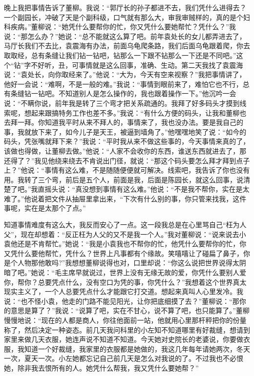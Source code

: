 \documentclass[12pt,oneside]{book}
\begin{document}
晚上我把事情告诉了董柳。我说：``郭厅长的孙子都进不去，我们凭什么进得去？一个副园长，冲破了天是个副科级，口气就有那么大，审我审贼样的，真的是个妇科疾病。''董柳说：``她凭什么要帮你的忙，你又凭什么要她帮忙？凭什么？''我说：``那怎么办？''她说：``总不能就这么算了吧。前年袁处长的女儿都弄进去了，马厅长我们不去比，袁震海有办法，前面乌龟爬条路，我们后面乌龟跟着爬，你去取取经，总有条缝让我们钻一钻吧，钻那么一下跟不钻那么一下还是不同吧。''这个``钻''字不好听，丑，可事情就是这么回事，准确、生动。第二天我找了袁震海说：``袁处长，向你取经来了。''他说：``大为，今天有空来视察？''我把事情讲了，他好一会说：``难啊，不是一般的难。''我说：``事情到眼前来了，难怕它也不行，总有条缝钻一钻吧。不知道别人是怎么操作的，我也跟着操作一下。''他沉吟一会说：``不瞒你说，前年我是转了三个弯才把关系疏通的。我拜了好多码头才摸到线索呢，想起来跟搞特务工作也差不多。''我说：``有什么方便的码头，让我和董柳也去拜一拜。你知道我平时从来不拜人的，事情来了，我也没办法。要是我自己的事，我就放下来了，如今儿子是天王，被逼到墙角了。''他嘿嘿地笑了说：``如今的码头，凭张嘴就拜下来？''我说：``平时我从来不做这些事的，今天事情来真的了，该做也得做，让董柳去做。''他说：``人家不会收你的东西，谁送东西就进去了，那还得了？''我见他绕来绕去不肯说出门径，就说：``那这个码头要怎么拜才拜到点子上？''他说：``事情有这么难，不是随随便便就可解决。线索吧，我告诉了你也没有用。我转了三个弯，前后是五个人，前面是我，后面是陈园长，就这么回事，说清楚了吧。''我直摇头说：``真没想到事情有这么难。''他说：``不是我不帮你，实在是太难了。''他说着把文件从抽屉里拿出来，``下次有什么别的事，你只管来找我，这件事呢，实在是太那个了点。''

知道事情难度有这么大，我反而安心了一点。这一段我总是在心里骂自己``枉为人父''，现在却想着：``反正枉为人父的又不是我一个人。''我对董柳说：``说来说去小袁他还是不肯帮忙。''她说：``我是小袁我也不帮你的忙，他凭什么要帮你的忙，你又凭什么要他帮忙，凭什么？世界上凡事都有个缘故。笑嘻嘻让了碰扁了鼻子，你是个人物那他敢吗?''我想想董柳说得也对，口里却说：``你这么说把世界说得太阴暗了吧。''她说：``毛主席早就说过，世界上没有无缘无故的爱，你凭什么要别人爱你，帮你？总要凭点什么，没有空口为凭的事，你凭什么？''我想着这个世界真太现实主义了，一个人总要凭点什么才能跟它打交道。想起来真叫人心里发冷。我说：``也不怪小袁，他走的门路不能见阳光，让你把底细摸了去？''董柳说：``那你的意思是算了？''我说：``说算了吧，实在不甘心，说不算了吧，也只能算了。''董柳慢慢地说：``现在的人都是商人，你往他面前一站，他就用心里那杆秤把你的份量称了，然后决定一种姿态。前几天我问科里的小左知不知道哪里有好裁缝，想请到家里来做几天衣服，她连声说不知道不知道。今天她对史院长的老婆说，你要做衣服，我知道一个好裁缝，我家里的衣服都是她做的，我这几年每年请她两次，冬天一次，夏天一次。小左她都忘记自己前几天是怎么对我说的了。不过我也不必恨她，除非我去恨所有的人。她凭什么帮我，我又凭什么要她帮？''
\end{document}
